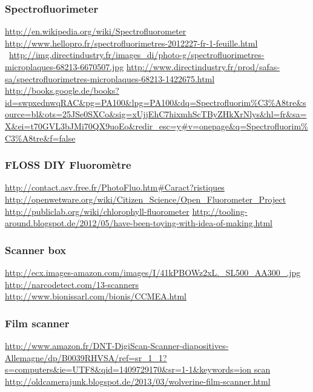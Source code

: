 \subsubsection {Spectrofluorimeter}
\url{http://en.wikipedia.org/wiki/Spectrofluorometer}
\url{http://www.hellopro.fr/spectrofluorimetres-2012227-fr-1-feuille.html}
~\url{http://img.directindustry.fr/images_di/photo-g/spectrofluorimetres-microplaques-68213-6670507.jpg}
\url{http://www.directindustry.fr/prod/safas-sa/spectrofluorimetres-microplaques-68213-1422675.html}
\href{http://books.google.de/books?id=swpxednwqRAC&pg=PA100&lpg=PA100&dq=Spectrofluorim?tre&source=bl&ots=25JSe0SXCo&sig=xUjjEhC7hixmhScTByZHkXrNlys&hl=fr&sa=X&ei=t70GVL3bJMi70QX9uoEo&redir_esc=y#v=onepage&q=Spectrofluorim?tre&f=false}{http://books.google.de/books?id=swpxednwqRAC\&pg=PA100\&lpg=PA100\&dq=Spectrofluorim\%C3\%A8tre\&source=bl\&ots=25JSe0SXCo\&sig=xUjjEhC7hixmhScTByZHkXrNlys\&hl=fr\&sa=X\&ei=t70GVL3bJMi70QX9uoEo\&redir\_esc=y\#v=onepage\&q=Spectrofluorim\%C3\%A8tre\&f=false}
~
\subsubsection {FLOSS DIY Fluorom\`etre}
\url{http://contact.asv.free.fr/PhotoFluo.htm#Caract?ristiques}
\url{http://openwetware.org/wiki/Citizen_Science/Open_Fluorometer_Project}
\url{http://publiclab.org/wiki/chlorophyll-fluorometer}
\url{http://tooling-around.blogspot.de/2012/05/have-been-toying-with-idea-of-making.html}
~
\subsubsection {Scanner box}
\url{http://ecx.images-amazon.com/images/I/41kPBOWz2xL._SL500_AA300_.jpg}
\url{http://narcodetect.com/13-scanners}
\url{http://www.bionissarl.com/bionis/CCMEA.html}
~
\subsubsection {Film scanner}
\url{http://www.amazon.fr/DNT-DigiScan-Scanner-diapositives-Allemagne/dp/B0039RHVSA/ref=sr_1_1?s=computers&ie=UTF8&qid=1409729170&sr=1-1&keywords=ion
scan}
\url{http://oldcamerajunk.blogspot.de/2013/03/wolverine-film-scanner.html}
~
